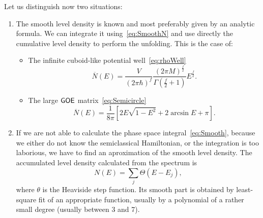 \documentclass[a4paper,11pt,twoside]{article}
\begin{document}
        Let us distinguish now two situations:
        \begin{enumerate}
            \item The smooth level density is known and most preferably given by an analytic formula.
                We can integrate it using~\eqref{eq:SmoothN} and use directly the cumulative level density to perform the unfolding.
                This is the case of:
                \begin{itemize}
                    \item
                        The infinite cuboid-like potential well~\eqref{eq:rhoWell}
                        \begin{equation}
                            \label{eq:NWell}
                            \overline{N}(E)
                                =\frac{V}{\left(2\pi\hbar\right)^{f}}\frac{\left(2\pi M\right)^{\frac{f}{2}}}{\Gamma\left(\frac{f}{2}+1\right)}E^{\frac{f}{2}}.
                        \end{equation}
                    \item
                        The large $\mathsf{GOE}$ matrix~\eqref{eq:Semicircle}
                        \begin{equation}
                            \label{eq:NSemicircle}
                            \overline{N}(E)
                                =\frac{1}{8\pi}\left[2E\sqrt{1-E^2}+2\arcsin{E}+\pi\right].
                        \end{equation}
                \end{itemize}

            \item
                If we are not able to calculate the phase space integral~\eqref{eq:Smooth}, because we either do not know the semiclassical Hamiltonian, or the integration is too laborious, we have to find an aproximation of the smooth level density.
                The accumulated level density calculated from the spectrum is
                \begin{equation}
                    N(E)=\sum_{j}\Theta\left(E-E_{j}\right),
                \end{equation}
                where $\theta$ is the Heaviside step function.
                Its smooth part is obtained by least-square fit of an appropriate function, usually by a polynomial of a rather small degree (usually between 3 and 7).


\end{enumerate}
\end{document}
